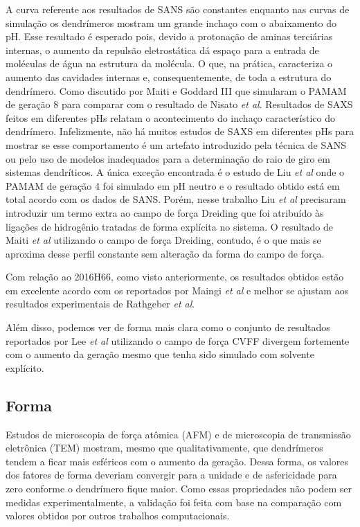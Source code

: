 A curva referente aos resultados de SANS\cite{Porcar2008} são constantes enquanto nas curvas de simulação os dendrímeros mostram um grande inchaço com o abaixamento do pH.
Esse resultado é esperado pois, devido a protonação de aminas terciárias internas, o aumento da repulsão eletrostática dá espaço para a entrada de moléculas de água na estrutura da molécula. 
O que, na prática, caracteriza o aumento das cavidades internas e, consequentemente, de toda a estrutura do dendrímero. Como discutido por Maiti e Goddard III\cite{Maiti2006} que simularam o PAMAM de geração 8 para comparar com o resultado de Nisato \textit{et al}\cite{Nisato2000}.
Resultados de SAXS\cite{Dootz2011} feitos em diferentes pHs relatam o acontecimento do inchaço característico do dendrímero.
Infelizmente, não há muitos estudos de SAXS em diferentes pHs para mostrar se esse comportamento é um artefato introduzido pela técnica de SANS ou pelo uso de modelos inadequados para a determinação do raio de giro em sistemas dendríticos.
A única exceção encontrada é o estudo de Liu \textit{et al}\cite{Liu2009} onde o PAMAM de geração 4 foi simulado em pH neutro e o resultado obtido está em total acordo com os dados de SANS\cite{Porcar2008}.
Porém, nesse trabalho Liu \textit{et al} precisaram introduzir um termo extra ao campo de força Dreiding que foi atribuído às ligações de hidrogênio tratadas de forma explícita no sistema.
O resultado de Maiti \textit{et al}\cite{Maiti2005} utilizando o campo de força Dreiding, contudo, é o que mais se aproxima desse perfil constante sem alteração da forma do campo de força.

Com relação ao 2016H66\cite{Horta2016}, como visto anteriormente, os resultados obtidos estão em excelente acordo com os reportados por Maingi \textit{et al}\cite{Maingi2012} e melhor se ajustam aos resultados experimentais de Rathgeber \textit{et al}\cite{Rathgeber2002}.

Além disso, podemos ver de forma mais clara como o conjunto de resultados reportados por Lee \textit{et al}\cite{Lee2002} utilizando o campo de força CVFF divergem fortemente com o aumento da geração mesmo que tenha sido simulado com solvente explícito.

\subsection{Forma}\label{PAMAMForma}

Estudos de microscopia de força atômica (AFM)\cite{Li2000} e de microscopia de transmissão eletrônica (TEM)\cite{Jackson1998} mostram, mesmo que qualitativamente, que dendrímeros tendem a ficar mais esféricos com o aumento da geração.
Dessa forma, os valores dos fatores de forma deveriam convergir para a unidade e de asfericidade para zero conforme o dendrímero fique maior.
Como essas propriedades não podem ser medidas experimentalmente, a validação foi feita com base na comparação com valores obtidos por outros trabalhos computacionais.

